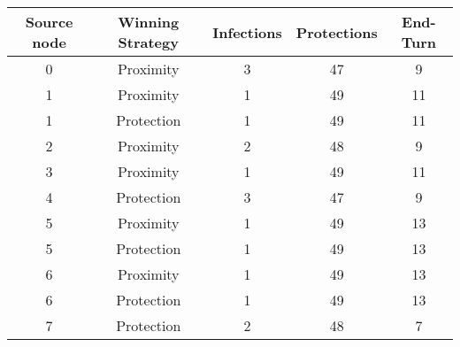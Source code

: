 \documentclass[results.tex]{subfiles}
\begin{document}
    \begin{center}
        \begin{tabular}{| c || c | c | c | c |}
            \hline
            {\bfseries Source node} & {\bfseries Winning Strategy} & {\bfseries Infections} & {\bfseries Protections}
            & {\bfseries End-Turn}
            \\  %
            \hline\hline
            0                       & Proximity                    & 3                      & 47                      & 9                    \\
            \hline
            1                       & Proximity                    & 1                      & 49                      & 11                   \\
            \hline
            1                       & Protection                   & 1                      & 49                      & 11                   \\
            \hline
            2                       & Proximity                    & 2                      & 48                      & 9                    \\
            \hline
            3                       & Proximity                    & 1                      & 49                      & 11                   \\
            \hline
            4                       & Protection                   & 3                      & 47                      & 9                    \\
            \hline
            5                       & Proximity                    & 1                      & 49                      & 13                   \\
            \hline
            5                       & Protection                   & 1                      & 49                      & 13                   \\
            \hline
            6                       & Proximity                    & 1                      & 49                      & 13                   \\
            \hline
            6                       & Protection                   & 1                      & 49                      & 13                   \\
            \hline
            7                       & Protection                   & 2                      & 48                      & 7                    \\

\end{tabular}
\end{center}
\end{document}
